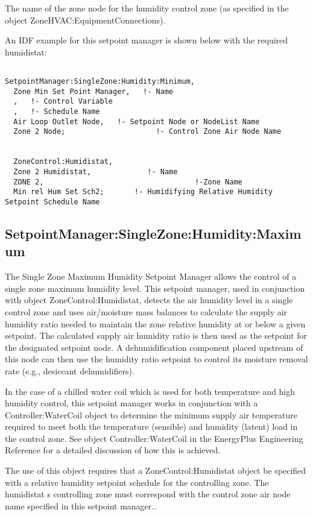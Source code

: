 The name of the zone node for the humidity control zone (as specified in the object ZoneHVAC:EquipmentConnections).

An IDF example for this setpoint manager is shown below with the required humidistat:

\begin{lstlisting}

SetpointManager:SingleZone:Humidity:Minimum,
  Zone Min Set Point Manager,   !- Name
  ,   !- Control Variable
  ,   !- Schedule Name
  Air Loop Outlet Node,   !- Setpoint Node or NodeList Name
  Zone 2 Node;                     !- Control Zone Air Node Name


  ZoneControl:Humidistat,
  Zone 2 Humidistat,             !- Name
  ZONE 2,                                   !-Zone Name
  Min rel Hum Set Sch2;       !- Humidifying Relative Humidity Setpoint Schedule Name
\end{lstlisting}

\subsection{SetpointManager:SingleZone:Humidity:Maximum}\label{setpointmanagersinglezonehumiditymaximum}

The Single Zone Maximum Humidity Setpoint Manager allows the control of a single zone maximum humidity level. This setpoint manager, used in conjunction with object ZoneControl:Humidistat, detects the air humidity level in a single control zone and uses air/moisture mass balances to calculate the supply air humidity ratio needed to maintain the zone relative humidity at or below a given setpoint. The calculated supply air humidity ratio is then used as the setpoint for the designated setpoint node. A dehumidification component placed upstream of this node can then use the humidity ratio setpoint to control its moisture removal rate (e.g., desiccant dehumidifiers).

In the case of a chilled water coil which is used for both temperature and high humidity control, this setpoint manager works in conjunction with a Controller:WaterCoil object to determine the minimum supply air temperature required to meet both the temperature (sensible) and humidity (latent) load in the control zone. See object Controller:WaterCoil in the EnergyPlus Engineering Reference for a detailed discussion of how this is achieved.

The use of this object requires that a ZoneControl:Humidistat object be specified with a relative humidity setpoint schedule for the controlling zone. The humidistat s controlling zone must correspond with the control zone air node name specified in this setpoint manager..

